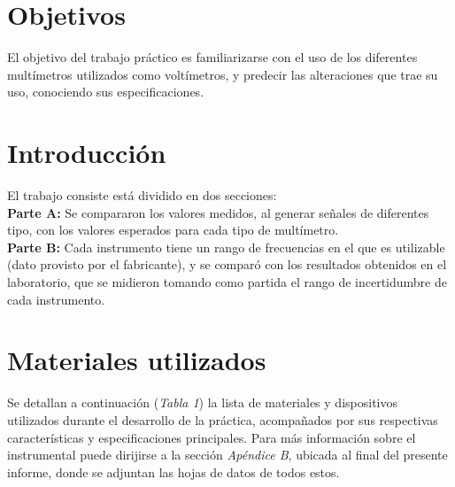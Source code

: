 \documentclass{article}
\begin{document}
\section{Objetivos}

	El objetivo del trabajo práctico es familiarizarse con el uso de los diferentes multímetros utilizados como voltímetros, y predecir las alteraciones que trae su uso, conociendo sus especificaciones.
\bigskip\bigskip




\section{Introducción}

	El trabajo consiste está dividido en dos secciones: \bigskip \\ 
	\indent \textbf{Parte A:} Se compararon los valores medidos, al generar señales de diferentes tipo, con los valores esperados para cada tipo de multímetro. \medskip \\ 
	\indent \textbf{Parte B:} Cada instrumento tiene un rango de frecuencias en el que es utilizable (dato provisto por el fabricante), y se comparó con los resultados obtenidos en el laboratorio, que se midieron tomando como partida el rango de incertidumbre de cada instrumento.
\bigskip\bigskip




\section{Materiales utilizados}

	Se detallan a continuación (\textit{Tabla 1}) la lista de materiales y dispositivos utilizados durante el desarrollo de la práctica, acompañados por sus respectivas características y especificaciones principales. Para más información sobre el instrumental puede dirijirse a la sección \textit{Apéndice B}, ubicada al final del presente informe, donde se adjuntan las hojas de datos de todos estos.
\bigskip\bigskip
\end{document}
